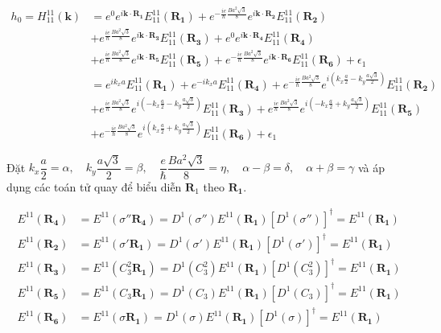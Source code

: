 \documentclass{article}
\begin{document}
\begin{align*}
	h_0 = H_{11}^{11}(\textbf{k}) & = e^{0}e^{i\mathbf{k\cdot R_1}} E_{11}^{11}(\mathbf{R_1}) + e^{-\frac{ie}{\hbar}\frac{Ba^2\sqrt{3}}{8}}e^{i\mathbf{k\cdot R_2}} E_{11}^{11}(\mathbf{R_2})                                                                                                         \\
	                              & + e^{\frac{ie}{\hbar}\frac{Ba^2\sqrt{3}}{8}}e^{i\mathbf{k\cdot R_3}} E_{11}^{11}(\mathbf{R_3}) + e^{0}e^{i\mathbf{k\cdot R_4}} E_{11}^{11}(\mathbf{R_4})                                                                                                          \\
	                              & + e^{\frac{ie}{\hbar}\frac{Ba^2\sqrt{3}}{8}}e^{i\mathbf{k\cdot R_5}} E_{11}^{11}(\mathbf{R_5}) + e^{-\frac{ie}{\hbar}\frac{Ba^2\sqrt{3}}{8}}e^{i\mathbf{k\cdot R_6}} E_{11}^{11}(\mathbf{R_6}) + \epsilon_1                                                       \\
	                              & = e^{ik_xa}E_{11}^{11}(\mathbf{R_1}) + e^{-ik_xa}E_{11}^{11}(\mathbf{R_4}) + e^{-\frac{ie}{\hbar}\frac{Ba^2\sqrt{3}}{8}}e^{i\left(k_x\frac{a}{2} - k_y\frac{a\sqrt{3}}{2}\right)} E_{11}^{11}(\mathbf{R_2})                                                       \\
	                              & + e^{\frac{ie}{\hbar}\frac{Ba^2\sqrt{3}}{8}}e^{i\left(-k_x\frac{a}{2} - k_y\frac{a\sqrt{3}}{2}\right)} E_{11}^{11}(\mathbf{R_3}) + e^{\frac{ie}{\hbar}\frac{Ba^2\sqrt{3}}{8}}e^{i\left(-k_x\frac{a}{2} + k_y\frac{a\sqrt{3}}{2}\right)} E_{11}^{11}(\mathbf{R_5}) \\
	                              & + e^{-\frac{ie}{\hbar}\frac{Ba^2\sqrt{3}}{8}}e^{i\left(k_x\frac{a}{2} + k_y\frac{a\sqrt{3}}{2}\right)} E_{11}^{11}(\mathbf{R_6}) + \epsilon_1
\end{align*}

\noindent Đặt $k_x\dfrac{a}{2} = \alpha,\quad k_y\dfrac{a\sqrt{3}}{2} = \beta, \quad \dfrac{e}{\hbar}\dfrac{Ba^2\sqrt{3}}{8} = \eta ,\quad \alpha - \beta = \delta,\quad \alpha + \beta = \gamma$ và áp dụng các toán tử quay để biểu diễn ${\mathbf{R}}_1$ theo $\mathbf{R_1}$.

\begin{align*}
	E^{11}(\mathbf{R_4}) & = E^{11}(\sigma''\mathbf{R_4}) = D^1(\sigma'') E^{11}(\mathbf{R_1}) \left[D^1(\sigma'')\right]^\dagger = E^{11}(\mathbf{R_1}) \\
	E^{11}(\mathbf{R_2}) & = E^{11}(\sigma'\mathbf{R_1}) = D^1(\sigma') E^{11}(\mathbf{R_1}) \left[D^1(\sigma')\right]^\dagger = E^{11}(\mathbf{R_1})    \\
	E^{11}(\mathbf{R_3}) & = E^{11}(C_3^2\mathbf{R_1}) = D^1(C_3^2) E^{11}(\mathbf{R_1}) \left[D^1(C_3^2)\right]^\dagger = E^{11}(\mathbf{R_1})          \\
	E^{11}(\mathbf{R_5}) & = E^{11}(C_3\mathbf{R_1}) = D^1(C_3) E^{11}(\mathbf{R_1}) \left[D^1(C_3)\right]^\dagger = E^{11}(\mathbf{R_1})                \\
	E^{11}(\mathbf{R_6}) & = E^{11}(\sigma\mathbf{R_1}) = D^1(\sigma) E^{11}(\mathbf{R_1}) \left[D^1(\sigma)\right]^\dagger = E^{11}(\mathbf{R_1})
\end{align*}
\end{document}
